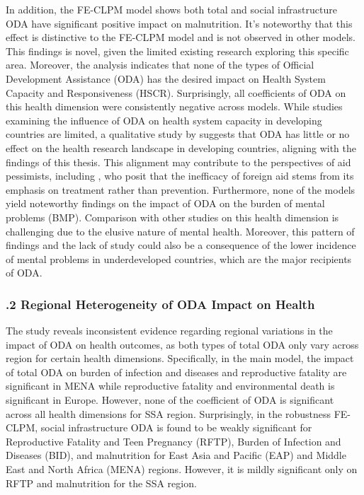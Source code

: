 In addition, the FE-CLPM model shows both total and social infrastructure ODA have significant positive impact on malnutrition. It's noteworthy that this effect is distinctive to the FE-CLPM model and is not observed in other models. This findings is novel, given the limited existing research exploring this specific area.
Moreover, the analysis indicates that none of the types of Official Development Assistance (ODA) has the desired impact on Health System Capacity and Responsiveness (HSCR). Surprisingly, all coefficients of ODA on this health dimension were consistently negative across models. While studies examining the influence of ODA on health system capacity in developing countries are limited, a qualitative study by \textcite{cassola_evaluating_2022} suggests that ODA has little or no effect on the health research landscape in developing countries, aligning with the findings of this thesis. This alignment may contribute to the perspectives of aid pessimists, including \textcite{easterly_aid_2004}, who posit that the inefficacy of foreign aid stems from its emphasis on treatment rather than prevention.  Furthermore, none of the models yield noteworthy findings on the impact of ODA on the burden of mental problems (BMP). Comparison with other studies on this health dimension is challenging due to the elusive nature of mental health. Moreover, this pattern of findings and the lack of study could also be a consequence of the lower incidence of mental problems in underdeveloped countries, which are the major recipients of ODA.




\subsubsection*{.2 Regional Heterogeneity of ODA Impact on Health}

The study reveals inconsistent evidence regarding regional variations in the impact of ODA on health outcomes, as both types of total ODA only vary across region for certain health dimensions. Specifically, in the main model, the impact of total ODA on burden of infection and diseases and reproductive fatality are significant in MENA while reproductive fatality and environmental death is significant in Europe. However, none of the coefficient of ODA is significant across all health dimensions for SSA region. Surprisingly, in the robustness FE-CLPM, social infrastructure ODA is found to be weakly significant for Reproductive Fatality and Teen Pregnancy (RFTP), Burden of Infection and Diseases (BID), and malnutrition for East Asia and Pacific (EAP) and Middle East and North Africa (MENA) regions. However, it is mildly significant only on RFTP and malnutrition for the SSA region. 


